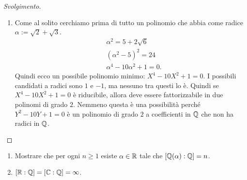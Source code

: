 \begin{proof}[Svolgimento]
\begin{enumerate}
\item Come al solito cerchiamo prima di tutto un polinomio che abbia come radice $\alpha := \sqrt2 + \sqrt3$.
\begin{align*}
& \alpha^2=5+2\sqrt{6} \\
& (\alpha^2 - 5)^2 = 24 \\
& \alpha^4 -10\alpha^2+1 = 0 .
\end{align*}
Quindi ecco un possibile polinomio minimo: $X^4 -10X^2+1 = 0$. I possibili candidati a radici sono $1$ e $-1$, ma nessuno tra questi lo è. Quindi se $X^4 -10X^2+1 = 0$ è riducibile, allora deve essere fattorizzabile in due polinomi di grado $2$. Nemmeno questa è una possibilità perché $Y^2-10Y+1 = 0$ è un polinomio di grado $2$ a coefficienti in $\Q$ che non ha radici in $\Q$.\qedhere
\end{enumerate}
\end{proof}

\begin{eser}[Estensioni di $\Q$]
\begin{enumerate}
\item Mostrare che  per ogni $n\ge 1$ esiste $\alpha \in \mathbb{R}$ tale che $[\mathbb{Q}(\alpha):\mathbb{Q}] = n$.
\item $[\mathbb{R}:\mathbb{Q}] = [\mathbb{C}:\mathbb{Q}]=\infty$.
\end{enumerate}
\end{eser}

